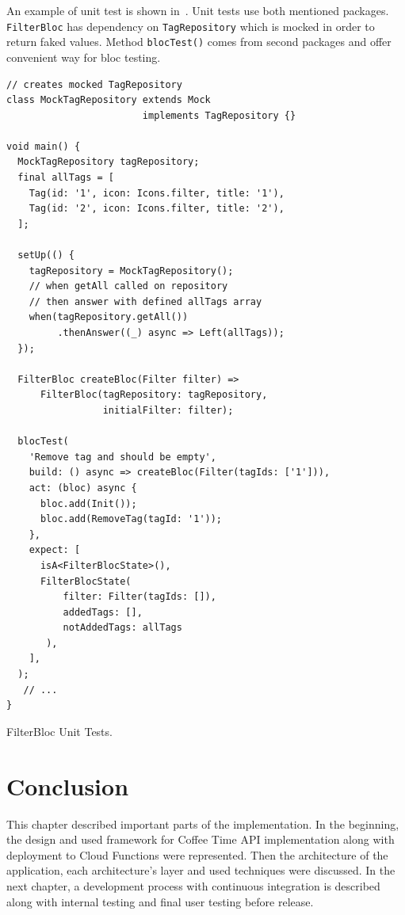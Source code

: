 An example of unit test is shown in~. Unit tests use both mentioned packages. \verb|FilterBloc| has dependency on \verb|TagRepository| which is mocked in order to return faked values. Method \verb|blocTest()| comes from second packages and offer convenient way for \gls{bloc} testing. 

\begin{listing}[ht]
\begin{verbatim}
// creates mocked TagRepository
class MockTagRepository extends Mock 
                        implements TagRepository {}

void main() {
  MockTagRepository tagRepository;
  final allTags = [
    Tag(id: '1', icon: Icons.filter, title: '1'),
    Tag(id: '2', icon: Icons.filter, title: '2'),
  ];

  setUp(() {
    tagRepository = MockTagRepository();
    // when getAll called on repository
    // then answer with defined allTags array
    when(tagRepository.getAll())
         .thenAnswer((_) async => Left(allTags));
  });

  FilterBloc createBloc(Filter filter) =>
      FilterBloc(tagRepository: tagRepository, 
                 initialFilter: filter);
  
  blocTest(
    'Remove tag and should be empty',
    build: () async => createBloc(Filter(tagIds: ['1'])),
    act: (bloc) async {
      bloc.add(Init());
      bloc.add(RemoveTag(tagId: '1'));
    },
    expect: [
      isA<FilterBlocState>(),
      FilterBlocState(
          filter: Filter(tagIds: []), 
          addedTags: [], 
          notAddedTags: allTags
       ),
    ],
  );
   // ...
}
\end{verbatim}
\caption{FilterBloc Unit Tests.}
\label{listing:ct-filter-bloc-unit-tests}
\end{listing}

\section{Conclusion}
This chapter described important parts of the implementation. In the beginning, the design and used framework for Coffee Time API implementation along with deployment to Cloud Functions were represented. Then the architecture of the application, each architecture's layer and used techniques were discussed. In the next chapter, a development process with continuous integration is described along with internal testing and final user testing before release.